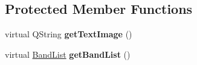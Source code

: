 \subsection*{Protected Member Functions}
\begin{DoxyCompactItemize}
\item 
\hypertarget{classQEAnalogIndicator_aaf3b7c4d82ec2a4c9edb607e53c932cf}{
virtual QString {\bfseries getTextImage} ()}
\label{classQEAnalogIndicator_aaf3b7c4d82ec2a4c9edb607e53c932cf}

\item 
\hypertarget{classQEAnalogIndicator_a892765b187e3a09e5c9ee17bd1d5da59}{
virtual \hyperlink{classQEAnalogIndicator_1_1BandList}{BandList} {\bfseries getBandList} ()}
\label{classQEAnalogIndicator_a892765b187e3a09e5c9ee17bd1d5da59}

\end{DoxyCompactItemize}
